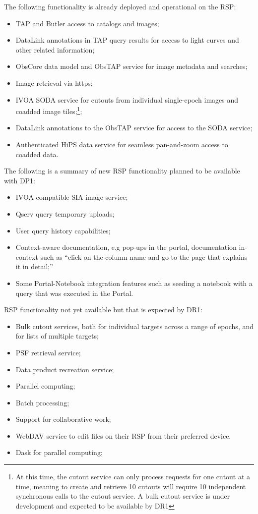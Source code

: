 The following functionality is already deployed and operational on the RSP:
\begin{itemize}
\item TAP and Butler access to catalogs and images;
\item DataLink annotations in TAP query results for access to light curves and other related information;
\item ObsCore data model and ObsTAP service for image metadata and searches;
\item Image retrieval via https;
\item IVOA SODA service for cutouts from individual single-epoch images and coadded image tiles;\footnote{At this time, the cutout service can only process requests for one cutout at a time, meaning to create and retrieve 10 cutouts will require 10 independent synchronous calls to the cutout service. A bulk cutout service is under development and expected to be available by DR1};
\item DataLink annotations to the ObsTAP service for access to the SODA service;
\item Authenticated HiPS data service for seamless pan-and-zoom access to coadded data.
\end{itemize}

The following is a summary of new RSP functionality planned to be available with  DP1: 
\begin{itemize}
\item IVOA-compatible SIA image service;
\item Qserv query temporary uploads;
\item User query history capabilities;
\item Context-aware documentation, e.g pop-ups in the portal, documentation in-context such as  ``click on the column name and go to the page that explains it in detail;''
\item Some Portal-Notebook integration features such as  seeding a notebook with a query that was executed in the Portal. 
\end{itemize}

RSP functionality not yet available but that is expected by DR1:
\begin{itemize}
\item Bulk cutout services, both for individual targets across a range of epochs, and for lists of multiple targets;
\item PSF retrieval service;
\item Data product recreation service; 
\item Parallel computing;
\item Batch processing; 
\item Support for collaborative work;
\item WebDAV service to edit files on their RSP from their preferred device. 
\item Dask for parallel computing;
\end{itemize} 



